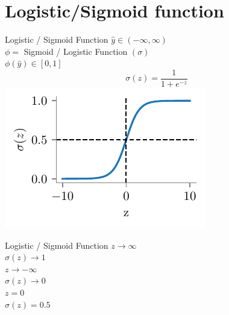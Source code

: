 \documentclass{beamer}
\begin{document}
\section{Logistic/Sigmoid function}

\begin{frame}{Logistic / Sigmoid Function}
$\hat{y} \in (-\infty, \infty)$ \\
$\phi =$ Sigmoid / Logistic Function $(\sigma)$ \\
$\phi(\hat{y}) \in [0, 1]$
\begin{equation*}
\sigma(z) = \frac{1}{1 + e^{-z}}
\end{equation*}
\includegraphics{../figures/logistic-regression/logistic-function.pdf}
\end{frame}

\begin{frame}{Logistic / Sigmoid Function}
 $z \rightarrow \infty$\\
\pause  $\sigma(z) \rightarrow 1$\\
\pause $z \rightarrow -\infty$\\
 \pause $\sigma(z) \rightarrow 0$\\
 \pause $z = 0$\\
 \pause $\sigma(z) = 0.5$

\end{frame}
\end{document}

